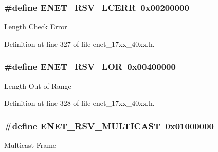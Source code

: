 \subsubsection[{\texorpdfstring{E\+N\+E\+T\+\_\+\+R\+S\+V\+\_\+\+L\+C\+E\+RR}{ENET_RSV_LCERR}}]{\setlength{\rightskip}{0pt plus 5cm}\#define E\+N\+E\+T\+\_\+\+R\+S\+V\+\_\+\+L\+C\+E\+RR~0x00200000}\hypertarget{group__ENET__17XX__40XX_gafadac62e2e18ad75a244e4227509931d}{}\label{group__ENET__17XX__40XX_gafadac62e2e18ad75a244e4227509931d}
Length Check Error 

Definition at line 327 of file enet\+\_\+17xx\+\_\+40xx.\+h.

\subsubsection[{\texorpdfstring{E\+N\+E\+T\+\_\+\+R\+S\+V\+\_\+\+L\+OR}{ENET_RSV_LOR}}]{\setlength{\rightskip}{0pt plus 5cm}\#define E\+N\+E\+T\+\_\+\+R\+S\+V\+\_\+\+L\+OR~0x00400000}\hypertarget{group__ENET__17XX__40XX_gaae8c1aa30582b7a66657c78b54bcf43a}{}\label{group__ENET__17XX__40XX_gaae8c1aa30582b7a66657c78b54bcf43a}
Length Out of Range 

Definition at line 328 of file enet\+\_\+17xx\+\_\+40xx.\+h.

\subsubsection[{\texorpdfstring{E\+N\+E\+T\+\_\+\+R\+S\+V\+\_\+\+M\+U\+L\+T\+I\+C\+A\+ST}{ENET_RSV_MULTICAST}}]{\setlength{\rightskip}{0pt plus 5cm}\#define E\+N\+E\+T\+\_\+\+R\+S\+V\+\_\+\+M\+U\+L\+T\+I\+C\+A\+ST~0x01000000}\hypertarget{group__ENET__17XX__40XX_gaf0bd8c3446555f296b06d4865c8cb6cd}{}\label{group__ENET__17XX__40XX_gaf0bd8c3446555f296b06d4865c8cb6cd}
Multicast Frame 

